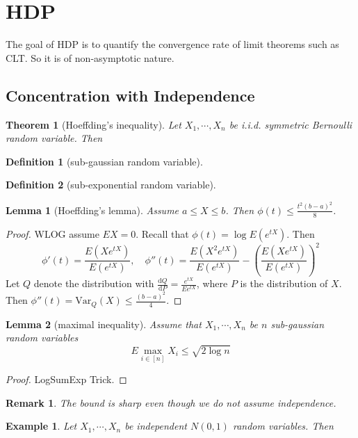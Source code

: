 \documentclass{article}
\newtheorem{Thm}{Theorem}[section]
\newtheorem{Lem}{Lemma}[section]
\newtheorem{Eg}{Example}[section]
\newtheorem*{Rk}{Remark}
\theoremstyle{definition}
\newtheorem{Def}{Definition}[section]
\begin{document}
\section{HDP}
The goal of HDP is to quantify the convergence rate of limit theorems such as CLT. So it is of non-asymptotic nature.
\subsection{Concentration with Independence}
\begin{Thm}[Hoeffding's inequality]
    Let $X_1,\cdots,X_n$ be i.i.d. symmetric Bernoulli random variable. Then 
\end{Thm}

\begin{Def}[sub-gaussian random variable]
    
\end{Def}


\begin{Def}[sub-exponential random variable]
    
\end{Def}


\begin{Lem}[Hoeffding's lemma]
    Assume $a\le X\le b$. Then $\phi(t)\le \frac{t^2(b-a)^2}{8}$.
\end{Lem}
\begin{proof}
    WLOG assume $EX=0$. Recall that $\phi(t)=\log E(e^{tX})$. Then 
    \[\phi'(t)=\frac{E(Xe^{tX})}{E(e^{tX})},\quad \phi''(t)=\frac{E(X^2e^{tX})}{E(e^{tX})}-(\frac{E(Xe^{tX})}{E(e^{tX})})^2\]
    Let $Q$ denote the distribution with $\frac{\mathrm{d} Q}{\mathrm{d} P} = \frac{e^{tX}}{Ee^{tX}} $, where $P$ is the distribution of $X$.
    Then $\phi''(t)=\text{Var}_Q(X)\le \frac{(b-a)^2}{4}$.
\end{proof}

\begin{Lem}[maximal inequality]
    Assume that $X_1,\cdots,X_n$ be $n$ sub-gaussian random variables
    \[E\max_{i\in[n]}X_i\le \sqrt{2\log n}\]
\end{Lem}
\begin{proof}
    LogSumExp Trick.
\end{proof}
\begin{Rk}
    The bound is sharp even though we do not assume independence.
\end{Rk}
\begin{Eg}
    Let $X_1,\cdots,X_n$ be independent $N(0,1)$ random variables. Then 
\end{Eg}
\end{document}
